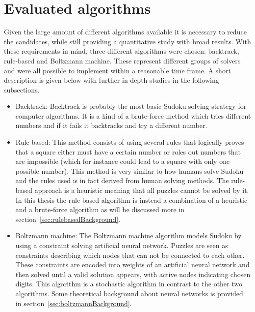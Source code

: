 \documentclass[a4paper,11pt]{kth-mag}
\begin{document}
\section{Evaluated algorithms}
Given the large amount of different algorithms available it is necessary to reduce the candidates, while still providing a quantitative study with broad results.
With these requirements in mind, three different algorithms were chosen: backtrack, rule-based and Boltzmann machine.
These represent different groups of solvers and were all possible to implement within a reasonable time frame.
A short description is given below with further in depth studies in the following subsections.
\begin{itemize}
    \item Backtrack:
    Backtrack is probably the most basic Sudoku solving strategy for computer algorithms.
It is a kind of a brute-force method which tries different numbers and if it fails it backtracks and try a different number.
    \item Rule-based:
    This method consists of using several rules that logically proves that a square either must have a certain number or roles out numbers that are impossible (which for instance could lead to a square with only one possible number).
This method is very similar to how humans solve Sudoku and the rules used is in fact derived from human solving methods.
The rule-based approach is a heuristic meaning that all puzzles cannot be solved by it. In this thesis the rule-based algorithm is instead a combination of a heuristic and a brute-force algorithm as will be discussed more in section~\ref{sec:rulebasedBackground}.
    \item Boltzmann machine:
    The Boltzmann machine algorithm models Sudoku by using a constraint solving artificial neural network.
Puzzles are seen as constraints describing which nodes that can not be connected to each other.
These constraints are encoded into weights of an artificial neural network and then solved until a valid solution appears, with active nodes indicating chosen digits. 
This algorithm is a stochastic algorithm in contrast to the other two algorithms. Some theoretical background about neural networks is provided in section~\ref{sec:boltzmannBackground}.
\end{itemize}

\FloatBarrier
\end{document}
